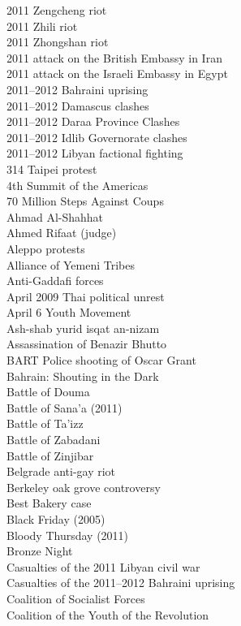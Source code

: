 2011 Zengcheng riot\\
2011 Zhili riot\\
2011 Zhongshan riot\\
2011 attack on the British Embassy in Iran\\
2011 attack on the Israeli Embassy in Egypt\\
2011–2012 Bahraini uprising\\
2011–2012 Damascus clashes\\
2011–2012 Daraa Province Clashes\\
2011–2012 Idlib Governorate clashes\\
2011–2012 Libyan factional fighting\\
314 Taipei protest\\
4th Summit of the Americas\\
70 Million Steps Against Coups\\
Ahmad Al-Shahhat\\
Ahmed Rifaat (judge)\\
Aleppo protests\\
Alliance of Yemeni Tribes\\
Anti-Gaddafi forces\\
April 2009 Thai political unrest\\
April 6 Youth Movement\\
Ash-shab yurid isqat an-nizam\\
Assassination of Benazir Bhutto\\
BART Police shooting of Oscar Grant\\
Bahrain: Shouting in the Dark\\
Battle of Douma\\
Battle of Sana'a (2011)\\
Battle of Ta'izz\\
Battle of Zabadani\\
Battle of Zinjibar\\
Belgrade anti-gay riot\\
Berkeley oak grove controversy\\
Best Bakery case\\
Black Friday (2005)\\
Bloody Thursday (2011)\\
Bronze Night\\
Casualties of the 2011 Libyan civil war\\
Casualties of the 2011–2012 Bahraini uprising\\
Coalition of Socialist Forces\\
Coalition of the Youth of the Revolution\\
